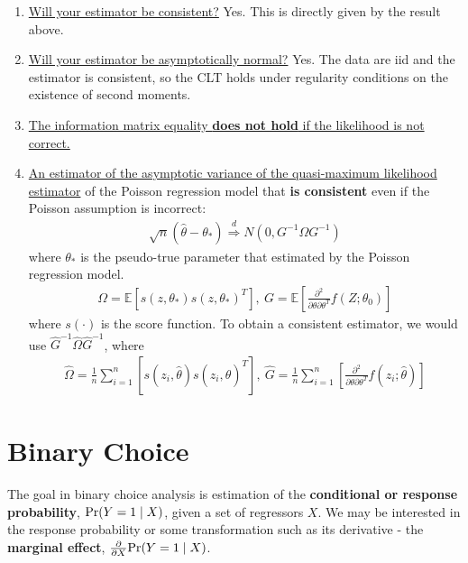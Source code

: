 \documentclass[11pt]{elegantbook}
\begin{document}
\begin{enumerate}
    \item \underline{Will your estimator be consistent?} Yes. This is directly given by the result above.
    \item \underline{Will your estimator be asymptotically normal?} Yes. The data are iid and the estimator is consistent, so the CLT holds under regularity conditions on the existence of second moments.
    \item \underline{The information matrix equality \textbf{does not hold} if the likelihood is not correct.}
    \item \underline{An estimator of the asymptotic variance of the quasi-maximum likelihood estimator} of the Poisson regression model that \textbf{is consistent} even if the Poisson assumption is incorrect:
    \begin{equation}
        \begin{aligned}
            \sqrt{n}\left(\hat{\theta}-\theta_*\right) \stackrel{d}{\Rightarrow} N\left(0,G^{-1}\Omega G^{-1}\right)
        \end{aligned}
        \nonumber
    \end{equation}
    where $\theta_*$ is the pseudo-true parameter that estimated by the Poisson regression model.
    \begin{equation}
        \begin{aligned}
            \Omega=\mathbb{E}[s(z,\theta_*)s(z,\theta_*)^T],\ G=\mathbb{E}\left[\frac{\partial^2}{\partial \theta\partial \theta^T}f(Z;\theta_0)\right]
        \end{aligned}
        \nonumber
    \end{equation}
    where $s(\cdot)$ is the score function. To obtain a consistent estimator, we would use $\hat{G}^{-1}\hat{\Omega}\hat{G}^{-1}$, where
    \begin{equation}
        \begin{aligned}
            \hat{\Omega}=\frac{1}{n}\sum_{i=1}^n[s(z_i,\hat{\theta})s(z_i,\hat{\theta})^T],\ \hat{G}=\frac{1}{n}\sum_{i=1}^n\left[\frac{\partial^2}{\partial \theta\partial \theta^T}f(z_i;\hat{\theta})\right]
        \end{aligned}
        \nonumber
    \end{equation}
\end{enumerate}


\section{Binary Choice}
The goal in binary choice analysis is estimation of the \textbf{conditional or response probability}, $\textnormal{Pr}(Y = 1 \mid X)$, given a set of regressors $X$. We may be interested in the response probability or some transformation such as its derivative - the \textbf{marginal effect}, $\frac{\partial }{\partial X}\textnormal{Pr}(Y = 1 \mid X)$.
\end{document}
